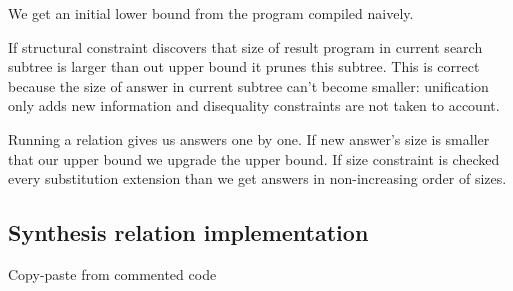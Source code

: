 We get an initial lower bound from the program compiled naively.

If structural constraint discovers that size of result program in current search subtree is larger than out upper bound it prunes this subtree. This is correct because the size of answer in current subtree can't become smaller: unification only adds new information and disequality constraints are not taken to account.

Running a relation gives us answers one by one. If new answer's size is smaller that our upper bound we upgrade the upper bound. If size constraint is checked every substitution extension than we get answers in non-increasing order of sizes.

\subsection{Synthesis relation implementation}
Copy-paste from commented code
